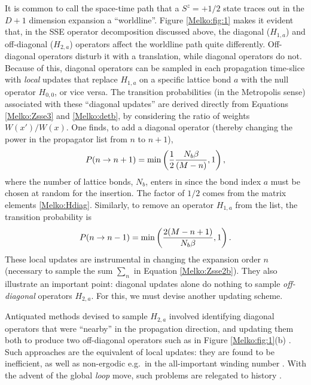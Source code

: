 \documentclass[vecphys]{svmult}
\begin{document}
It is common to call the space-time path that a $S^z=+1/2$ state traces out in the $D+1$ dimension expansion a ``worldline''.  Figure \ref{Melko:fig:1} makes it evident that, in the SSE operator decomposition discussed above, the diagonal ($H_{1,a}$) and off-diagonal ($H_{2,a}$) operators affect the worldline path quite differently.  Off-diagonal operators disturb it with a translation, while diagonal operators do not.  Because of this, diagonal operators can be sampled in each propagation time-slice with {\em local} updates that replace $H_{1,a}$ on a specific lattice bond $a$ with the null operator $H_{0,0}$, or vice versa.  The transition probabilities (in the Metropolis sense) associated with these ``diagonal updates'' are derived directly from Equations \ref{Melko:Zsse3} and \ref{Melko:detb}, by considering the ratio of weights $W(x')/W(x)$.  One finds,
to add a diagonal operator (thereby changing the power in the propagator list from $n$ to $n+1$),
\begin{eqnarray}
P(n \rightarrow n+1) = {\rm min} \left({ \frac{1}{2}\frac{N_b \beta}{(M-n)}, 1 }\right),
\end{eqnarray}
where the number of lattice bonds, $N_b$, enters in since the bond index $a$ must be chosen at random for the insertion.  The factor of $1/2$ comes from the matrix elements \ref{Melko:Hdiag}.  Similarly, to remove an operator $H_{1,a}$ from the list, the transition probability is
\begin{eqnarray}
P(n \rightarrow n-1) = {\rm min} \left({ \frac{2(M-n+1)}{N_b \beta}, 1 }\right).
\end{eqnarray}
These local updates are instrumental in changing the expansion order $n$ (necessary to sample the sum $\sum_n$ in Equation \ref{Melko:Zsse2b}).  They also illustrate an important point: diagonal updates alone do nothing to sample {\em off-diagonal} operators $H_{2,a}$.  For this, we must devise another updating scheme.

Antiquated methods devised to sample $H_{2,a}$ involved identifying diagonal operators that were ``nearby'' in the propagation direction, and updating them both to produce two off-diagonal operators such as in Figure \ref{Melko:fig:1}(b) \cite{Melko:SandvikHeis}.  Such approaches are the equivalent of local updates: they are found to be inefficient, as well as non-ergodic e.g.~in the all-important winding number \cite{Melko:PC}.  With the advent of the global {\it loop} move, such problems are relegated to history \cite{Melko:Sandvik99,Melko:Syljuasen02}.  
\end{document}
